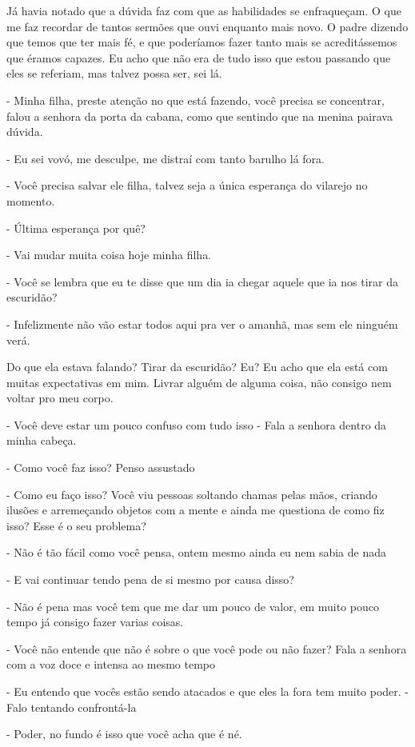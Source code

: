 Já havia notado que a dúvida faz com que as habilidades se enfraqueçam. O que me faz recordar de tantos sermões que ouvi enquanto mais novo. O padre dizendo que temos que ter mais fé, e que poderíamos fazer tanto mais se acreditássemos que éramos capazes. Eu acho que não era de tudo isso que estou passando que eles se referiam, mas talvez possa ser, sei lá.

- Minha filha, preste atenção no que está fazendo, você precisa se concentrar, falou a senhora da porta da cabana, como que sentindo que na menina pairava dúvida.

- Eu sei vovó, me desculpe, me distraí com tanto barulho lá fora.

- Você precisa salvar ele filha, talvez seja a única esperança do vilarejo no momento.

- Última esperança por quê?

- Vai mudar muita coisa hoje minha filha.

- Você se lembra que eu te disse que um dia ia chegar aquele que ia nos tirar da escuridão?

- Infelizmente não vão estar todos aqui pra ver o amanhã, mas sem ele ninguém verá.

Do que ela estava falando? Tirar da escuridão? Eu? Eu acho que ela está com muitas expectativas em mim. Livrar alguém de alguma coisa, não consigo nem voltar pro meu corpo.

- Você deve estar um pouco confuso com tudo isso - Fala a senhora dentro da minha cabeça.

- Como você faz isso? Penso assustado 

- Como eu faço isso? Você viu pessoas soltando chamas pelas mãos, criando ilusões e arremeçando objetos com a mente e ainda me questiona de como fiz isso? Esse é o seu problema?

- Não é tão fácil como você pensa, ontem mesmo ainda eu nem sabia de nada

- E vai continuar tendo pena de si mesmo por causa disso?

- Não é pena mas você tem que me dar um pouco de valor, em muito pouco tempo já consigo fazer varias coisas.

- Você não entende que não é sobre o que você pode ou não fazer? Fala a senhora com a voz doce e intensa ao mesmo tempo 

- Eu entendo que vocês estão sendo atacados e que eles la fora tem muito poder. - Falo tentando confrontá-la

- Poder, no fundo é isso que você acha que é né.

